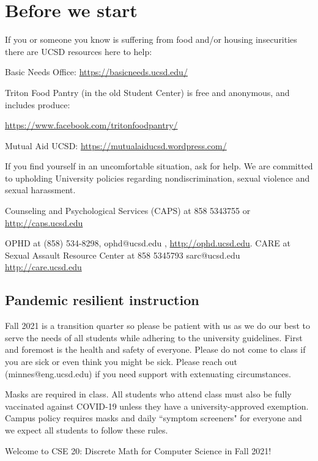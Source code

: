 \documentclass[12pt, oneside]{article}
\begin{document}
        
        
        
\section*{Before we start}
If you or someone you know is suffering from food and/or housing insecurities 
there are UCSD resources here to help:

Basic Needs Office: \href{https://basicneeds.ucsd.edu/}{https://basicneeds.ucsd.edu/}

Triton Food Pantry (in the old Student Center)
is free and anonymous, and includes produce: 

\href{https://www.facebook.com/tritonfoodpantry/}{https://www.facebook.com/tritonfoodpantry/}

Mutual Aid UCSD: \href{https://mutualaiducsd.wordpress.com/}{https://mutualaiducsd.wordpress.com/}

If you find yourself in an uncomfortable situation, ask for help. 
We are committed to upholding University policies regarding nondiscrimination, sexual violence and sexual harassment.

Counseling and Psychological Services (CAPS) at 858 5343755 or \href{http://caps.ucsd.edu}{http://caps.ucsd.edu}


OPHD at (858) 534-8298, ophd@ucsd.edu , \href{http://ophd.ucsd.edu}{http://ophd.ucsd.edu}. 
CARE at Sexual Assault Resource Center at 858 5345793 sarc@ucsd.edu \href{http://care.ucsd.edu}{http://care.ucsd.edu}

\subsection*{Pandemic resilient instruction}
Fall 2021 is a transition quarter so please be patient with us as we do our best 
to serve the needs of all students while adhering to the university guidelines. 
First and foremost is the health and safety of everyone.  
Please do not come to class if you are sick or even think you might be sick.
Please reach out (minnes@eng.ucsd.edu) if you need support with extenuating circumstances.

Masks are required in class. All students who attend class must also be fully vaccinated against COVID-19
unless they have a university-approved exemption.
Campus policy requires masks and daily ``symptom screeners" for everyone and we expect all students 
to follow these rules. 


\newpage
Welcome to CSE 20: Discrete Math for Computer Science in Fall 2021! 
\end{document}
